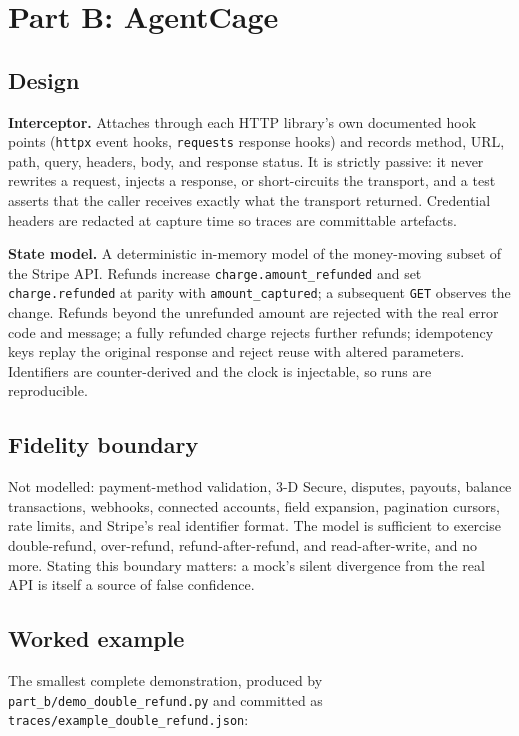 \documentclass[11pt]{article}
\begin{document}
\section{Part B: AgentCage}
\label{sec:partb}

\subsection{Design}

\textbf{Interceptor.} Attaches through each HTTP library's own documented hook points
(\texttt{httpx} event hooks, \texttt{requests} response hooks) and records method, URL,
path, query, headers, body, and response status. It is strictly passive: it never
rewrites a request, injects a response, or short-circuits the transport, and a test
asserts that the caller receives exactly what the transport returned. Credential headers
are redacted at capture time so traces are committable artefacts.

\textbf{State model.} A deterministic in-memory model of the money-moving subset of the
Stripe API. Refunds increase \texttt{charge.amount\_refunded} and set
\texttt{charge.refunded} at parity with \texttt{amount\_captured}; a subsequent
\texttt{GET} observes the change. Refunds beyond the unrefunded amount are rejected with
the real error code and message; a fully refunded charge rejects further refunds;
idempotency keys replay the original response and reject reuse with altered parameters.
Identifiers are counter-derived and the clock is injectable, so runs are reproducible.

\subsection{Fidelity boundary}

Not modelled: payment-method validation, 3-D Secure, disputes, payouts, balance
transactions, webhooks, connected accounts, field expansion, pagination cursors, rate
limits, and Stripe's real identifier format. The model is sufficient to exercise
double-refund, over-refund, refund-after-refund, and read-after-write, and no more.
Stating this boundary matters: a mock's silent divergence from the real API is itself a
source of false confidence.

\subsection{Worked example}

The smallest complete demonstration, produced by \texttt{part\_b/demo\_double\_refund.py}
and committed as \texttt{traces/example\_double\_refund.json}:
\end{document}
